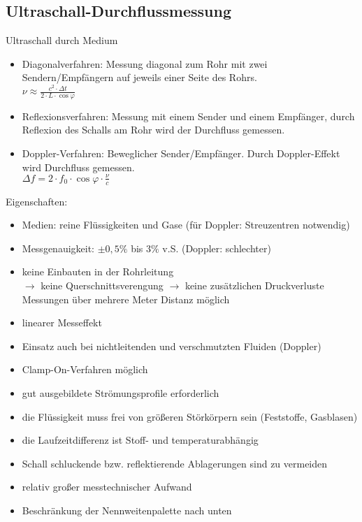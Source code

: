 \subsection{Ultraschall-Durchflussmessung}
Ultraschall durch Medium
\begin{itemize}
\item Diagonalverfahren: Messung diagonal zum Rohr mit zwei Sendern/Empfängern auf jeweils einer Seite des Rohrs.\\
 $\nu \approx \frac{c^2 \cdot \Delta t}{2 \cdot L \cdot \cos \varphi}$
\item Reflexionsverfahren: Messung mit einem Sender und einem Empfänger, durch Reflexion des Schalls am Rohr wird der Durchfluss gemessen.
\item Doppler-Verfahren: Beweglicher Sender/Empfänger. Durch Doppler-Effekt wird Durchfluss gemessen.\\
$\Delta f = 2 \cdot f_0 \cdot \cos \varphi \cdot \frac{\nu}{c}$
\end{itemize}
Eigenschaften:
\begin{itemize}
\item Medien: reine Flüssigkeiten und Gase (für Doppler: Streuzentren notwendig)
\item Messgenauigkeit: $\pm 0,5\%$ bis $3 \%$ v.S. (Doppler: schlechter)
\end{itemize}
\begin{itemize}[label=$+$]
\item keine Einbauten in der Rohrleitung\\
$\to$ keine Querschnittsverengung $\to$ keine zusätzlichen Druckverluste\\
Messungen über mehrere Meter Distanz möglich
\item linearer Messeffekt
\item Einsatz auch bei nichtleitenden und verschmutzten Fluiden (Doppler)
\item Clamp-On-Verfahren möglich
\end{itemize}
\begin{itemize}[label=$-$]
\item gut ausgebildete Strömungsprofile erforderlich
\item die Flüssigkeit muss frei von größeren Störkörpern sein (Feststoffe, Gasblasen)
\item die Laufzeitdifferenz ist Stoff- und temperaturabhängig
\item Schall schluckende bzw. reflektierende Ablagerungen sind zu vermeiden
\item relativ großer messtechnischer Aufwand
\item Beschränkung der Nennweitenpalette nach unten
\end{itemize}

